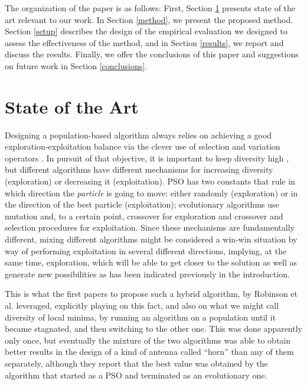 \documentclass[runningheads]{llncs}
\begin{document}
The organization of the paper is as follows: First, Section \ref{soa} presents
state of the art relevant to our work. In Section \ref{method}, we present the
proposed method.  Section \ref{setup} describes the design of the empirical
evaluation we designed to assess the effectiveness of the method, and in Section
\ref{results}, we report and discuss the results. Finally, we offer the
conclusions of this paper and suggestions on future work in Section
\ref{conclusions}.

\section{State of the Art}
\label{soa}

Designing a population-based algorithm always relies on achieving a
good exploration-exploitation balance via the clever use of selection
and variation operators \cite{vcrepinvsek2013exploration}. In pursuit
of that objective, it is important to keep diversity high
\cite{yuan2005importance}, but different algorithms have different
mechanisms for increasing diversity (exploration) or decreasing it
(exploitation). PSO has two constants that rule in which direction the
{\em particle} is going to move: either randomly (exploration) or in
the direction of the best particle (exploitation); evolutionary
algorithms use mutation and, to a certain point, crossover for
exploration and crossover and selection procedures for
exploitation. Since these mechanisms are fundamentally different,
mixing different algorithms might be considered a win-win situation by
way of performing exploitation in several different directions,
implying, at the same time, exploration, which will be able to get
closer to the solution as well as generate new possibilities as has
been indicated previously in the introduction.

This is what the first papers to propose such a hybrid algorithm, by
Robinson et al. \cite{Robinson2002} leveraged, explicitly playing on this
fact, and also on what we might call diversity of local minima, by
running an algorithm on a population until it became stagnated, and
then switching to the other one. This was done apparently only once,
but eventually the mixture of the two algorithms was able to obtain
better results in the design of a kind of antenna called ``horn'' than
any of them separately, although they report that the best value
was obtained by the algorithm that started as a PSO and terminated as
an evolutionary one.
\end{document}
